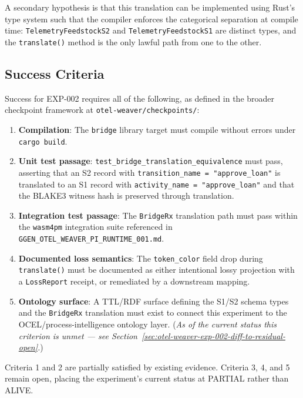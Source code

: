 A secondary hypothesis is that this translation can be implemented using Rust's type
system such that the compiler enforces the categorical separation at compile time:
\texttt{TelemetryFeedstockS2} and \texttt{TelemetryFeedstockS1} are distinct types,
and the \texttt{translate()} method is the only lawful path from one to the other.

\subsection{Success Criteria}
\label{sec:otel-weaver-exp-002-diff-to-residual-rq-success}

Success for EXP-002 requires all of the following, as defined in the broader
checkpoint framework at \texttt{otel-weaver/checkpoints/}:

\begin{enumerate}
    \item \textbf{Compilation}: The \texttt{bridge} library target must compile without
          errors under \texttt{cargo build}.
    \item \textbf{Unit test passage}: \texttt{test\_bridge\_translation\_equivalence}
          must pass, asserting that an S2 record with
          \texttt{transition\_name = "approve\_loan"} is translated to an S1 record
          with \texttt{activity\_name = "approve\_loan"} and that the BLAKE3
          witness hash is preserved through translation.
    \item \textbf{Integration test passage}: The \texttt{BridgeRx} translation path
          must pass within the \texttt{wasm4pm} integration suite referenced in
          \texttt{GGEN\_OTEL\_WEAVER\_PI\_RUNTIME\_001.md}.
    \item \textbf{Documented loss semantics}: The \texttt{token\_color} field drop
          during \texttt{translate()} must be documented as either intentional lossy
          projection with a \texttt{LossReport} receipt, or remediated by a downstream
          mapping.
    \item \textbf{Ontology surface}: A TTL/RDF surface defining the S1/S2 schema types
          and the \texttt{BridgeRx} translation must exist to connect this experiment
          to the OCEL/process-intelligence ontology layer. (\emph{As of the current
          status this criterion is unmet --- see Section~\ref{sec:otel-weaver-exp-002-diff-to-residual-open}.})
\end{enumerate}

Criteria 1 and 2 are partially satisfied by existing evidence. Criteria 3, 4, and 5
remain open, placing the experiment's current status at PARTIAL rather than ALIVE.

